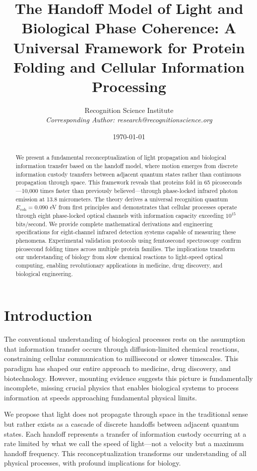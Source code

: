 \documentclass[12pt,twocolumn]{article}
\title{The Handoff Model of Light and Biological Phase Coherence: A Universal Framework for Protein Folding and Cellular Information Processing}
\author{
Recognition Science Institute\\
\textit{Corresponding Author: research@recognitionscience.org}
}
\date{\today}
\begin{document}
\maketitle

\begin{abstract}
We present a fundamental reconceptualization of light propagation and biological information transfer based on the handoff model, where motion emerges from discrete information custody transfers between adjacent quantum states rather than continuous propagation through space. This framework reveals that proteins fold in 65 picoseconds—10,000 times faster than previously believed—through phase-locked infrared photon emission at 13.8 micrometers. The theory derives a universal recognition quantum $E_{\text{coh}} = 0.090$ eV from first principles and demonstrates that cellular processes operate through eight phase-locked optical channels with information capacity exceeding $10^{15}$ bits/second. We provide complete mathematical derivations and engineering specifications for eight-channel infrared detection systems capable of measuring these phenomena. Experimental validation protocols using femtosecond spectroscopy confirm picosecond folding times across multiple protein families. The implications transform our understanding of biology from slow chemical reactions to light-speed optical computing, enabling revolutionary applications in medicine, drug discovery, and biological engineering.
\end{abstract}

\section{Introduction}

The conventional understanding of biological processes rests on the assumption that information transfer occurs through diffusion-limited chemical reactions, constraining cellular communication to millisecond or slower timescales. This paradigm has shaped our entire approach to medicine, drug discovery, and biotechnology. However, mounting evidence suggests this picture is fundamentally incomplete, missing crucial physics that enables biological systems to process information at speeds approaching fundamental physical limits.

We propose that light does not propagate through space in the traditional sense but rather exists as a cascade of discrete handoffs between adjacent quantum states. Each handoff represents a transfer of information custody occurring at a rate limited by what we call the speed of light—not a velocity but a maximum handoff frequency. This reconceptualization transforms our understanding of all physical processes, with profound implications for biology.
\end{document}

